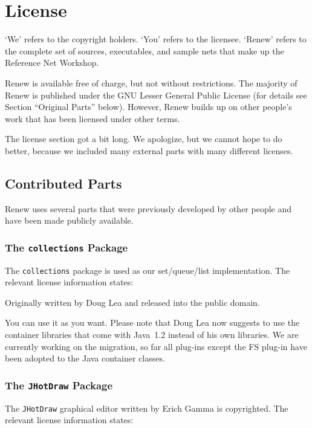 \chapter{License}
\label{ch:license}%

`We' refers to the copyright holders. `You' refers to the licensee.
`Renew' refers to the complete set of sources, executables,
and sample nets that make up the Reference Net Workshop.

Renew is available free of charge, but not without restrictions.
The majority of Renew is published under the GNU Lesser General Public
License (for details see Section ``Original Parts'' below).
However, Renew builds up on other people's work that has been licensed
under other terms.

The license section got a bit long. We apologize, but we cannot hope
to do better, because we included many external parts with many
different licenses.


\section{Contributed Parts}

Renew uses several parts that were previously developed by other 
people and have been made publicly available.

\subsection{The \texttt{collections} Package}

The \texttt{collections} package is used as our set/queue/list
implementation. The relevant license information states:

\begin{licensequote}
Originally written by Doug Lea and released into the public domain. 
\end{licensequote}

You can use it as you want. Please note that Doug Lea now suggests to
use the container libraries that come with Java~1.2 instead of his own 
libraries. 
We are currently working on the migration, so far all plug-ins
except the FS plug-in have been adopted to the Java container classes.


\subsection{The \texttt{JHotDraw} Package}

The \texttt{JHotDraw} graphical editor written by Erich Gamma is 
copyrighted. The relevant license information states:

